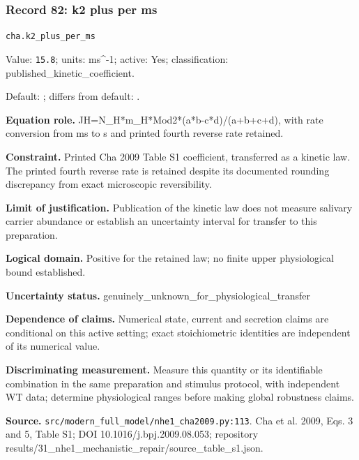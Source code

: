 \subsubsection*{Record 82: k2 plus per ms}
{\small \nolinkurl{cha.k2_plus_per_ms}\par

Value: \texttt{15.8}; units: ms\textasciicircum{}-1; active: Yes; classification: published\_kinetic\_coefficient.\par

Default: ; differs from default: .\par

\textbf{Equation role.} JH=N\_H*m\_H*Mod2*(a*b-c*d)/(a+b+c+d), with rate conversion from ms to s and printed fourth reverse rate retained.\par

\textbf{Constraint.} Printed Cha 2009 Table S1 coefficient, transferred as a kinetic law. The printed fourth reverse rate is retained despite its documented rounding discrepancy from exact microscopic reversibility.\par

\textbf{Limit of justification.} Publication of the kinetic law does not measure salivary carrier abundance or establish an uncertainty interval for transfer to this preparation.\par

\textbf{Logical domain.} Positive for the retained law; no finite upper physiological bound established.\par

\textbf{Uncertainty status.} genuinely\_unknown\_for\_physiological\_transfer\par

\textbf{Dependence of claims.} Numerical state, current and secretion claims are conditional on this active setting; exact stoichiometric identities are independent of its numerical value.\par

\textbf{Discriminating measurement.} Measure this quantity or its identifiable combination in the same preparation and stimulus protocol, with independent WT data; determine physiological ranges before making global robustness claims.\par

\textbf{Source.} \nolinkurl{src/modern_full_model/nhe1_cha2009.py:113}. Cha et al. 2009, Eqs. 3 and 5, Table S1; DOI 10.1016/j.bpj.2009.08.053; repository results/31\_nhe1\_mechanistic\_repair/source\_table\_s1.json.\par}

